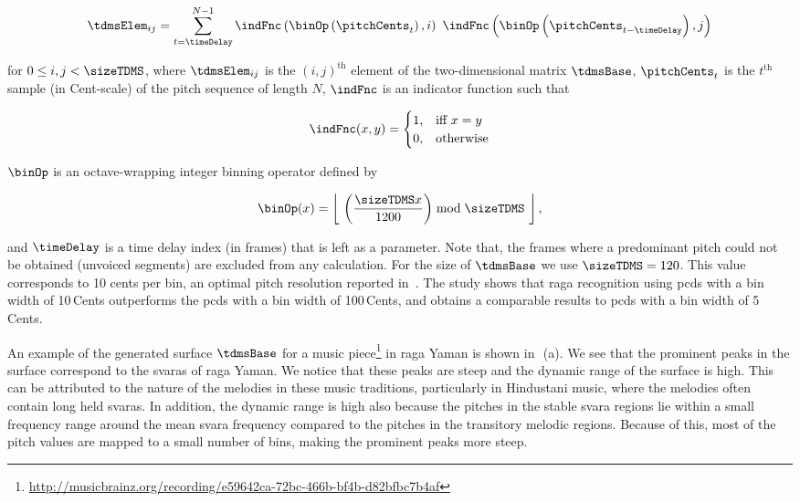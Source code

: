 \begin{equation}
\label{eq:surface_computation1}	
\tdmsElem_{ij} = \sum_{t=\timeDelay}^{N-1} \indFnc\left(\binOp\left(\pitchCents_t\right),i\right)~ \indFnc\left(\binOp\left(\pitchCents_{t-\timeDelay}\right),j\right) 
\end{equation}

for $0 \leq i,j < \sizeTDMS$, where $\tdmsElem_{ij}$ is the $(i,j)^\mathrm{th}$ element of the two-dimensional matrix $\tdmsBase$, $\pitchCents_t$ is the $t^\mathrm{th}$ sample (in Cent-scale) of the pitch sequence of length $N$, $\indFnc$ is an indicator function such that

\begin{equation}
\begin{aligned}
\indFnc(x,y)=
\begin{cases}
1, & \text{iff } x=y\\
0, & \text{otherwise}
\end{cases}
\end{aligned}
\end{equation}
 
$\binOp$ is an octave-wrapping integer binning operator defined by
 
\begin{equation}	
\label{eq:binning_function}	
\binOp(x) = \left\lfloor ~\left(\frac{\sizeTDMS x}{1200}\right) \bmod \sizeTDMS ~\right\rfloor,
\end{equation}

and $\timeDelay$ is a time delay index (in frames) that is left as a parameter. Note that, the frames where a predominant pitch could not be obtained (unvoiced segments) are excluded from any calculation. For the size of $\tdmsBase$ we use $\sizeTDMS = 120$. This value  corresponds to 10 cents per bin, an optimal pitch resolution reported in~\citep{chordia2013joint}. The study shows that \gls{raga} recognition using \glspl{pcd} with a bin width of 10\,Cents outperforms the \glspl{pcd} with a bin width of 100\,Cents, and obtains a comparable results to \glspl{pcd} with a bin width of 5\,Cents.

An example of the generated surface $\tdmsBase$ for a music piece\footnote{\url{http://musicbrainz.org/recording/e59642ca-72bc-466b-bf4b-d82bfbc7b4af}} in \gls{raga} Yaman is shown in~\,(a). We see that the prominent peaks in the surface correspond to the \glspl{svara} of \gls{raga} Yaman. We notice that these peaks are steep and the dynamic range of the surface is high. This can be attributed to the nature of the melodies in these music traditions, particularly in Hindustani music, where the melodies often contain long held \glspl{svara}. In addition, the dynamic range is high also because the pitches in the stable \gls{svara} regions lie within a small frequency range around the mean \gls{svara} frequency compared to the pitches in the transitory melodic regions. Because of this, most of the pitch values are mapped to a small number of bins, making the prominent peaks more steep.

